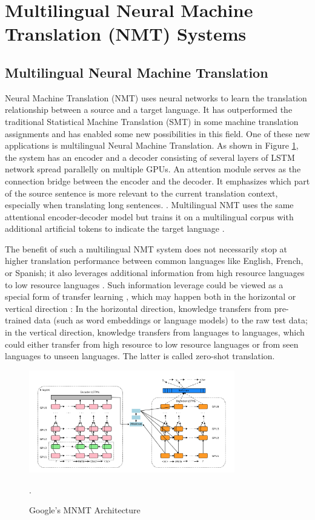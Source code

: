 \documentclass[thesis,fonts=libertine]{cluu}
\begin{document}
\section{Multilingual Neural Machine Translation (NMT) Systems}

\subsection{Multilingual Neural Machine Translation}

Neural Machine Translation (NMT) uses neural networks to learn the translation relationship between a source and a target language. It has outperformed the traditional Statistical Machine Translation (SMT) in some machine translation assignments and has enabled some new possibilities in this field. One of these new applications is multilingual Neural Machine Translation. As shown in Figure \ref{fig:google_mnmt}, the system has an encoder and a decoder consisting of several layers of LSTM network spread parallelly on multiple GPUs. An attention module serves as the connection bridge between the encoder and the decoder. It emphasizes which part of the source sentence is more relevant to the current translation context, especially when translating long sentences. \parencite{Wu:2016aa}. Multilingual NMT uses the same attentional encoder-decoder model but trains it on a multilingual corpus with additional artificial tokens to indicate the target language \parencite{Johnson:2016aa}.

The benefit of such a multilingual NMT system does not necessarily stop at higher translation performance between common languages like English, French, or Spanish; it also leverages additional information from high resource languages to low resource languages \parencite{Zoph:2016aa}. Such information leverage could be viewed as a special form of transfer learning \parencite{Zoph:2016aa}, which may happen both in the horizontal or vertical direction \parencite{Lakew:2019aa}: In the horizontal direction, knowledge transfers from pre-trained data (such as word embeddings or language models) to the raw test data; in the vertical direction, knowledge transfers from languages to languages, which could either transfer from high resource to low resource languages or from seen languages to unseen languages. The latter is called zero-shot translation.

\begin{figure}
  \centering
  \includegraphics[width=0.8\textwidth]{google_mnmt_architecture.png}
  \caption{Google's MNMT Architecture \parencite{Johnson:2016aa,Wu:2016aa}}.
  \label{fig:google_mnmt}
\end{figure}
\end{document}
